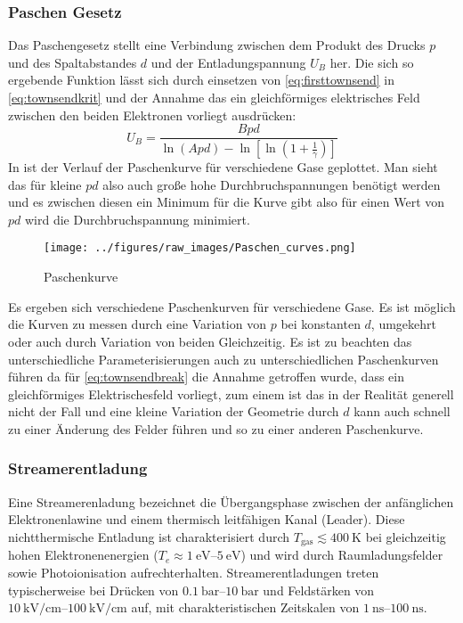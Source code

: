 \subsubsection{Paschen Gesetz}
\label{sec:paschenlaw}
Das Paschengesetz stellt eine Verbindung zwischen dem Produkt des Drucks \(p\) und des Spaltabstandes \(d\) und der Entladungspannung \(U_B\) her. Die sich so ergebende Funktion lässt sich durch einsetzen von \eqref{eq:firsttownsend} in \eqref{eq:townsendkrit} und der Annahme das ein gleichförmiges elektrisches Feld zwischen den beiden Elektronen vorliegt ausdrücken:
\begin{equation}
    U_B = \frac{Bpd}{\ln\left( Apd \right) - \ln\left[ \ln\left(1 + \frac{1}{\gamma} \right) \right]}
    \label{eq:townsendbreak}
\end{equation}
In  ist der Verlauf der Paschenkurve für verschiedene Gase geplottet. Man sieht das für kleine \(pd\) also auch große hohe Durchbruchspannungen benötigt werden und es zwischen diesen ein Minimum für die Kurve gibt also für einen Wert von \(pd\) wird die Durchbruchspannung minimiert.

  \begin{figure}[htbp]
    \centering
    \texttt{[image: ../figures/raw\_images/Paschen\_curves.png]}
    \caption{Paschenkurve}
    \label{fig:paschencurve}
  \end{figure}

Es ergeben sich verschiedene Paschenkurven für verschiedene Gase. Es ist möglich die Kurven zu messen durch eine Variation von \(p\) bei konstanten \(d\), umgekehrt oder auch durch Variation von beiden Gleichzeitig. Es ist zu beachten das unterschiedliche Parameterisierungen auch zu unterschiedlichen Paschenkurven führen da für \eqref{eq:townsendbreak} die Annahme getroffen wurde, dass ein gleichförmiges Elektrischesfeld vorliegt, zum einem ist das in der Realität generell nicht der Fall und eine kleine Variation der Geometrie durch \(d\) kann auch schnell zu einer Änderung des Felder führen und so zu einer anderen Paschenkurve. \cite{kuffel2000}


\subsubsection{Streamerentladung}
\label{sec:streamerdischarge}
Eine Streamerenladung bezeichnet die Übergangsphase zwischen der anfänglichen Elektronenlawine und einem thermisch leitfähigen Kanal (Leader).  Diese nichtthermische Entladung ist charakterisiert durch $T_{\text{gas}} \lesssim \SI{400}{\kelvin}$ bei gleichzeitig hohen Elektronenenergien ($T_e \approx \SIrange{1}{5}{\electronvolt}$) und wird durch Raumladungsfelder sowie Photoionisation aufrechterhalten. Streamerentladungen treten typischerweise bei Drücken von $\SIrange{0.1}{10}{\bar}$ und Feldstärken von $\SIrange{10}{100}{\kilo\volt\per\centi\meter}$ auf, mit charakteristischen Zeitskalen von $\SIrange{1}{100}{\nano\second}$.

